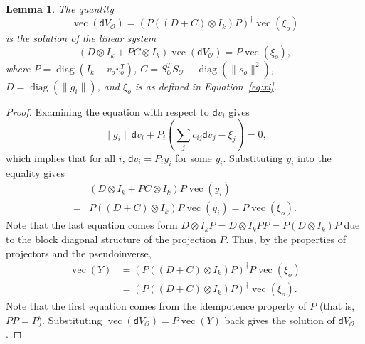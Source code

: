 \documentclass{article}
\newtheorem{lemma}[theorem]{Lemma}
\DeclareMathOperator{\diag}{diag}
\DeclareMathOperator{\vect}{vec}
\newcommand{\norm}[1] {\|#1\|}
\newcommand{\dd}{\mathsf{d}}
\newcommand{\outdex}{o}
\newcommand{\outset}{\mathcal{O}}
\begin{document}
	\begin{lemma}\label{lemma:inv} 
	The quantity
		\begin{equation}
		 \vect(\dd V_{\outset}) = \left(P\left( (D+C) \otimes I_k \right) P\right)^{\dagger}\vect(\xi_{\outdex})   
		\end{equation}
	is the solution of the linear system
		\begin{equation}
			(D  \otimes I_k+PC\otimes I_k)\vect(\dd V_{\outset})=P\vect(\xi_{\outdex}),
		\end{equation}
		where $P=\diag(I_k-v_{\outdex} v_{\outdex}^T)$, $C = S_{\outset}^T S_{\outset} - \diag(\norm{s_{\outdex}}^2)$, $D = \diag(\|g_i\|)$, and $\xi_{\outdex}$ is as defined in Equation~\eqref{eq:xi}.
	\end{lemma}
	\begin{proof}
		Examining the equation with respect to $\dd v_i$ gives
		\begin{equation}
			\|g_i\| \dd v_i + P_i \left(\sum_j c_{ij}\dd v_j-\xi_j \right) = 0,
		\end{equation}
		which implies that for all $i$, $\dd v_i=P_iy_i$ for some $y_i$.
		Substituting $y_i$ into the equality gives
		\begin{align}
			&(D \otimes I_k + PC \otimes I_k)P\vect(y_i)\\
			=&P((D +C)\otimes I_k) P\vect(y_i) = P\vect(\xi_{\outdex}).
		\end{align}
		Note that the last equation comes form $D\otimes I_k P = D\otimes I_k PP = P (D\otimes I_k) P $ due to the block diagonal structure of the projection $P$.
		Thus, by the properties of projectors and the pseudoinverse,
		\begin{align}
			\vect(Y) &= (P((D + C)\otimes I_k) P)^\dagger P\vect(\xi_{\outdex})\\
			&=(P((D +C)\otimes I_k) P)^\dagger\vect(\xi_{\outdex}).
\end{align}
		Note that the first equation comes from the idempotence property of $P$ (that is, $PP=P$).
		Substituting $\vect(\dd V_{\outset}) = P \vect(Y)$ back gives the solution of $\dd V_{\outset}$.
	\end{proof}
	
\end{document}
